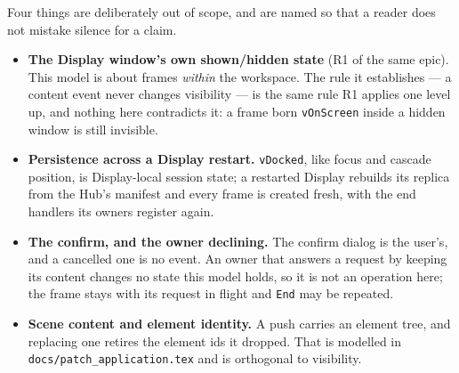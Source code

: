 \documentclass[a4paper,10pt,fleqn]{article}
\begin{document}
Four things are deliberately out of scope, and are named so that a reader
does not mistake silence for a claim.

\begin{itemize}
  \item \textbf{The Display window's own shown/hidden state} (R1 of the same
    epic).  This model is about frames \emph{within} the workspace.  The rule
    it establishes --- a content event never changes visibility --- is the
    same rule R1 applies one level up, and nothing here contradicts it: a
    frame born \texttt{vOnScreen} inside a hidden window is still invisible.
  \item \textbf{Persistence across a Display restart.}  \texttt{vDocked}, like
    focus and cascade position, is Display-local session state; a restarted
    Display rebuilds its replica from the Hub's manifest and every frame is
    created fresh, with the end handlers its owners register again.
  \item \textbf{The confirm, and the owner declining.}  The confirm dialog
    is the user's, and a cancelled one is no event.  An owner that answers a
    request by keeping its content changes no state this model holds, so it
    is not an operation here; the frame stays with its request in flight and
    \texttt{End} may be repeated.
  \item \textbf{Scene content and element identity.}  A push carries an
    element tree, and replacing one retires the element ids it dropped.  That
    is modelled in \texttt{docs/patch\_application.tex} and is orthogonal to
    visibility.
\end{itemize}
\end{document}
